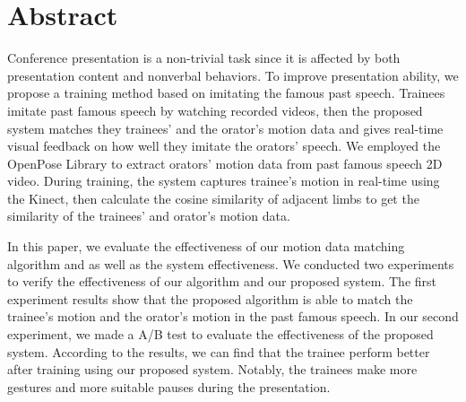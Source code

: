 \chapter*{Abstract}
\par Conference presentation is a non-trivial task since it is affected by both presentation content and nonverbal behaviors. To improve presentation ability, we propose a training method based on imitating the famous past speech. Trainees imitate past famous speech by watching recorded videos, then the proposed system matches they trainees' and the orator's motion data and gives real-time visual feedback on how well they imitate the orators' speech. We employed the OpenPose Library to extract orators' motion data from past famous speech 2D video. During training, the system captures trainee's motion in real-time using the Kinect, then calculate the cosine similarity of adjacent limbs to get the similarity of the trainees' and orator's motion data.  
\par In this paper, we evaluate the effectiveness of our motion data matching algorithm and as well as the system effectiveness. We conducted two experiments to verify the effectiveness of our algorithm and our proposed system. The first experiment results show that the proposed algorithm is able to match the trainee’s motion and the orator's motion in the past famous speech. In our second experiment, we made a A/B test to evaluate the effectiveness of the proposed system. According to the results, we can find that the trainee perform better after training using our proposed system. Notably, the trainees make more gestures and more suitable pauses during the presentation.  
